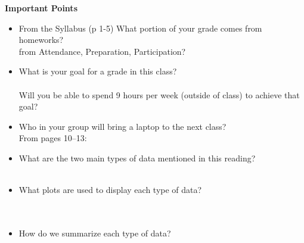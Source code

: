  \begin{center}
   {\large\bf Important Points}
 \end{center}

 \begin{itemize}
    \item From the Syllabus (p 1-5) 
       What portion of your grade comes from homeworks?\\ %
       from Attendance, Preparation, Participation?
    \item  What is your goal for a grade in this class?\\ \\
       Will you be able to spend 9 hours per week (outside of
       class) to achieve that goal?\\
     \item Who in your group will bring a laptop to the next class?\\

       From pages 10--13:
     \item What are the two main types of data mentioned in this
       reading?\\ \\
     \item What plots are used to display each type of data? \\ \\ \\
     \item How do we summarize each type of data?\\ \\ 

 \end{itemize}